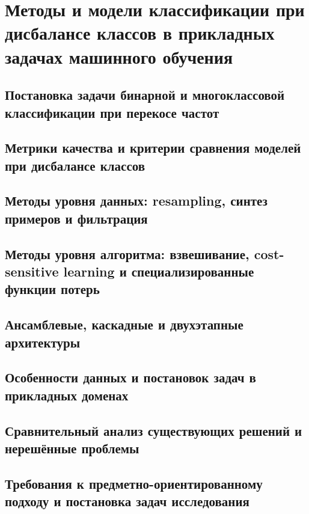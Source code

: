 \section[Методы и модели классификации при дисбалансе классов]{Методы и модели классификации при дисбалансе классов в прикладных задачах машинного обучения}
\label{sec:chapter1}

\subsection{Постановка задачи бинарной и многоклассовой классификации при перекосе частот}
\label{sec:ch1-1}

\subsection{Метрики качества и критерии сравнения моделей при дисбалансе классов}
\label{sec:ch1-2}

\subsection{Методы уровня данных: resampling, синтез примеров и фильтрация}
\label{sec:ch1-3}

\subsection{Методы уровня алгоритма: взвешивание, cost-sensitive learning и специализированные функции потерь}
\label{sec:ch1-4}

\subsection{Ансамблевые, каскадные и двухэтапные архитектуры}
\label{sec:ch1-5}

\subsection{Особенности данных и постановок задач в прикладных доменах}
\label{sec:ch1-6}

\subsection{Сравнительный анализ существующих решений и нерешённые проблемы}
\label{sec:ch1-7}

\subsection{Требования к предметно-ориентированному подходу и постановка задач исследования}
\label{sec:ch1-8}
